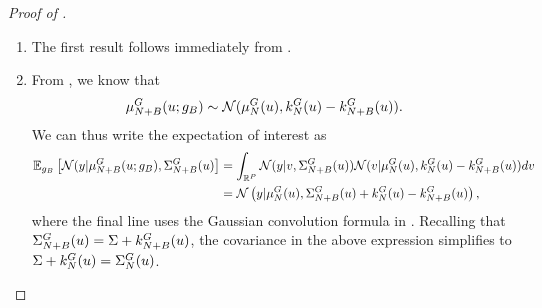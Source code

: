 \documentclass[12pt]{article}
\begin{document}
\begin{proof} [Proof of ]

\begin{enumerate}
\item The first result follows immediately from . 
\item From , we know that 
\begin{align*}
\emMean[\Naugment]{\fwd}(\Par; \designBatchFwd)
&\sim \Gaussian(\emMean[\Ndesign]{\fwd}(\Par), \emKer[\Ndesign]{\fwd}(\Par) - \emKer[\Naugment]{\fwd}(\Par)). 
\end{align*}
We can thus write the expectation of interest as 
\begin{align*}
\E_{\designBatchFwd}\left[\Gaussian(\obs | \emMean[\Naugment]{\fwd}(\Par; \designBatchFwd), \CovComb[\Naugment](\Par) \right]
&= \int_{\R^{\dimObs}} \Gaussian(\obs| v, \CovComb[\Naugment](\Par)) 
\Gaussian(v | \emMean[\Ndesign]{\fwd}(\Par), \emKer[\Ndesign]{\fwd}(\Par) - \emKer[\Naugment]{\fwd}(\Par)) dv \\
&= \Gaussian\left(\obs | \emMean[\Ndesign]{\fwd}(\Par), \CovComb[\Naugment](\Par) + \emKer[\Ndesign]{\fwd}(\Par) - \emKer[\Naugment]{\fwd}(\Par)\right), 
\end{align*}
where the final line uses the Gaussian convolution formula in . Recalling that 
$\CovComb[\Naugment](\Par) = \likPar + \emKer[\Naugment]{\fwd}(\Par)$, the covariance in the above expression simplifies to 
$\likPar + \emKer[\Ndesign]{\fwd}(\Par) = \CovComb[\Ndesign](\Par)$. 


\end{enumerate}
\end{proof}
\end{document}

